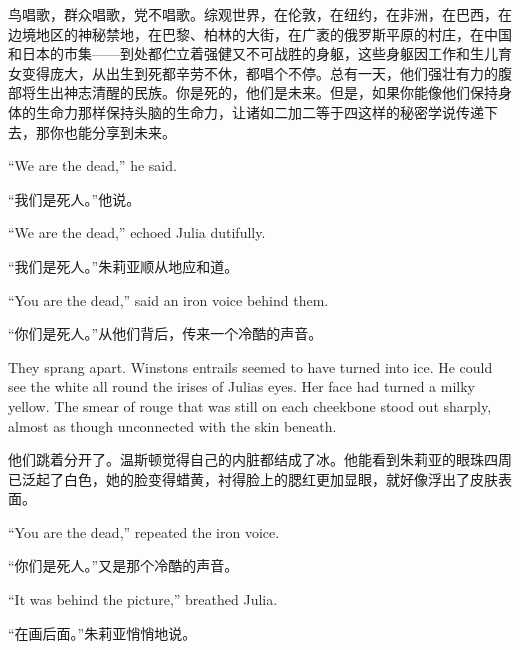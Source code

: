 \begin{paracol}{2}
\switchcolumn

鸟唱歌，群众唱歌，党不唱歌。综观世界，在伦敦，在纽约，在非洲，在巴西，在边境地区的神秘禁地，在巴黎、柏林的大街，在广袤的俄罗斯平原的村庄，在中国和日本的市集——到处都伫立着强健又不可战胜的身躯，这些身躯因工作和生儿育女变得庞大，从出生到死都辛劳不休，都唱个不停。总有一天，他们强壮有力的腹部将生出神志清醒的民族。你是死的，他们是未来。但是，如果你能像他们保持身体的生命力那样保持头脑的生命力，让诸如二加二等于四这样的秘密学说传递下去，那你也能分享到未来。

\switchcolumn*

``We are the dead,'' he said.

\switchcolumn

``我们是死人。''他说。

\switchcolumn*

``We are the dead,'' echoed Julia dutifully.

\switchcolumn

``我们是死人。''朱莉亚顺从地应和道。

\switchcolumn*

``You are the dead,'' said an iron voice behind them.

\switchcolumn

``你们是死人。''从他们背后，传来一个冷酷的声音。

\switchcolumn*

They sprang apart. Winston\textquotesingle s entrails seemed to have
turned into ice. He could see the white all round the irises of
Julia\textquotesingle s eyes. Her face had turned a milky yellow. The
smear of rouge that was still on each cheekbone stood out sharply,
almost as though unconnected with the skin beneath.

\switchcolumn

他们跳着分开了。温斯顿觉得自己的内脏都结成了冰。他能看到朱莉亚的眼珠四周已泛起了白色，她的脸变得蜡黄，衬得脸上的腮红更加显眼，就好像浮出了皮肤表面。

\switchcolumn*

``You are the dead,'' repeated the iron voice.

\switchcolumn

``你们是死人。''又是那个冷酷的声音。

\switchcolumn*

``It was behind the picture,'' breathed Julia.

\switchcolumn

``在画后面。''朱莉亚悄悄地说。

\switchcolumn*


\end{paracol}
